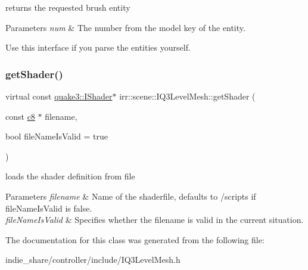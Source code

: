 returns the requested brush entity 


\begin{DoxyParams}{Parameters}
{\em num} & The number from the model key of the entity.\\
\hline
\end{DoxyParams}
Use this interface if you parse the entities yourself. \mbox{\label{classirr_1_1scene_1_1IQ3LevelMesh_aa2f9609e950e32876665d7531a54a484}} 
\subsubsection{\texorpdfstring{get\+Shader()}{getShader()}}
{\footnotesize\ttfamily virtual const \hyperlink{structirr_1_1scene_1_1quake3_1_1IShader}{quake3\+::\+I\+Shader}$\ast$ irr\+::scene\+::\+I\+Q3\+Level\+Mesh\+::get\+Shader (\begin{DoxyParamCaption}\item[{const \hyperlink{namespaceirr_a9395eaea339bcb546b319e9c96bf7410}{c8} $\ast$}]{filename,  }\item[{bool}]{file\+Name\+Is\+Valid = {\ttfamily true} }\end{DoxyParamCaption})\hspace{0.3cm}{\ttfamily [pure virtual]}}



loads the shader definition from file 


\begin{DoxyParams}{Parameters}
{\em filename} & Name of the shaderfile, defaults to /scripts if file\+Name\+Is\+Valid is false. \\
\hline
{\em file\+Name\+Is\+Valid} & Specifies whether the filename is valid in the current situation. \\
\hline
\end{DoxyParams}


The documentation for this class was generated from the following file\+:\begin{DoxyCompactItemize}
\item 
indie\+\_\+share/controller/include/I\+Q3\+Level\+Mesh.\+h\end{DoxyCompactItemize}
